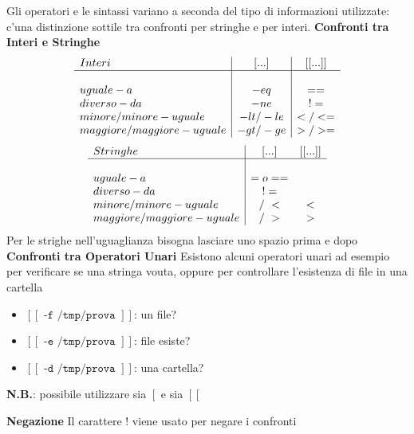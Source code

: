 \begin{flushleft}
  Gli operatori e le sintassi variano a seconda del tipo di informazioni utilizzate: c'\ace una 
  distinzione sottile tra confronti per stringhe e per interi.
  \textbf{Confronti tra Interi e Stringhe}
  $$\begin{array}{l|c|c}
    Interi & [...] & [[...]] \\
    \hline & \\
    uguale-a & -eq & == \\
    diverso-da & -ne & != \\
    minore/minore-uguale & -lt / -le & < / <= \\
    maggiore/maggiore-uguale & -gt / -ge & > / >= \\
  \end{array}$$
  $$\begin{array}{l|cc}
    Stringhe & [...] & [[...]] \\
    \hline & \\
    uguale-a & = o == \\
    diverso-da &   != \\
    minore/minore-uguale & /\ < & <  \\
    maggiore/maggiore-uguale & /\ > & >  \\
  \end{array}$$
  Per le strighe nell'uguaglianza bisogna lasciare uno spazio prima e dopo
  \textbf{Confronti tra Operatori Unari}
  Esistono alcuni operatori unari ad esempio per verificare se una stringa \ace 
  vouta, oppure per controllare l'esistenza di file in una cartella
  \begin{itemize}
    \item $[[\texttt{ -f /tmp/prova }]]$: \ace un file?
    \item $[[\texttt{ -e /tmp/prova }]]$: file esiste?
    \item $[[\texttt{ -d /tmp/prova }]]$: \ace una cartella?
  \end{itemize}
  \textbf{N.B.}: \ace possibile utilizzare sia $\left[\right.$ e sia $\left[\left[\right.\right.$\par
  \textbf{Negazione}
  Il carattere ! viene usato per negare i confronti
\end{flushleft}
